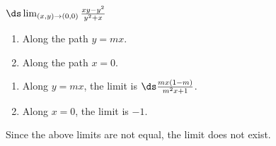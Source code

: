 {$\ds \lim_{(x,y)\to(0,0)} \frac{xy-y^2}{y^2+x}$
\begin{enumerate}
	\item Along the path $y=mx$.
	\item Along the path $x=0$.
\end{enumerate}}
{\begin{enumerate}
	\item Along $y=mx$, the limit is $\ds\frac{mx(1-m)}{m^2x+1}$.
	\item	Along $x=0$, the limit is $-1$.
\end{enumerate}
Since the above limits are not equal, the limit does not exist.
}
